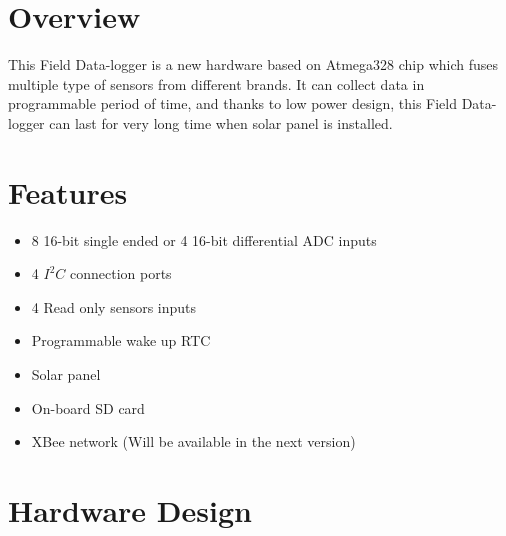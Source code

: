 \newpage
\tableofcontents \newpage
\listoffigures  \newpage

\newpage

\section{Overview}
    This Field Data-logger is a new hardware based on Atmega328 chip which fuses multiple type of sensors from different brands. It can collect data in programmable period of time, and thanks to low power design, this Field Data-logger can last for very long time when solar panel is installed.

\section{Features}
    \begin{itemize}
    \item 8 16-bit single ended or 4 16-bit differential ADC inputs
    \item 4 $I^{2}C$ connection ports
    \item 4 Read only sensors inputs
    \item Programmable wake up RTC
    \item Solar panel
    \item On-board SD card
    \item XBee network (Will be available in the next version)
    \end{itemize}


\newpage
\section{Hardware Design}
